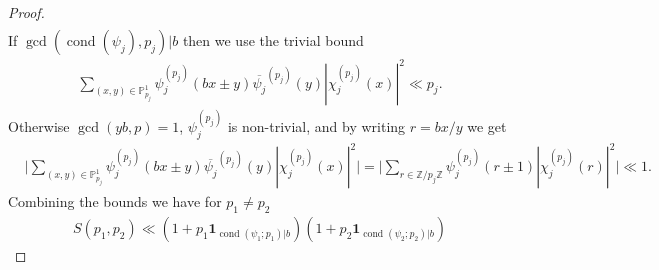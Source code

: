 \documentclass[12pt]{amsart}
\theoremstyle{definition}
\theoremstyle{remark}
\numberwithin{equation}{section}
\newcommand{\cond}{\operatorname{cond}}
\newcommand{\Z}{{\mathbb Z}}
\newcommand{\1}{{\mathbf 1}}
\renewcommand{\P}{\mathbb{P}}
\begin{document}
\begin{proof}
\begin{align*}
\end{align*}
If  $\gcd (\cond (\psi_j),p_j)|b$  then we use the trivial bound
\begin{align*}
   \sum_{(x,y) \in \P^1_{p_j}}  \psi_j^{(p_j)} (bx\pm y)  \overline{\psi_j}^{(p_j)}  (y) |\chi_j^{(p_j)}  (x )|^2   \ll p_j.
\end{align*}
Otherwise $\gcd(yb,p)=1$, $\psi_j^{(p_j)} $ is non-trivial,  and by writing $r = bx/y$ we get
\begin{align*}
    &\bigg|\sum_{(x,y) \in \P^1_{p_j}}  \psi_j^{(p_j)} (bx\pm y)  \overline{\psi_j}^{(p_j)}  (y) |\chi_j^{(p_j)}  (x )|^2\bigg|= \bigg|\sum_{r \in \Z/p_j \Z} \psi_j^{(p_j)} (r\pm 1)  |\chi_j^{(p_j)}  (r )|^2  \bigg|  \ll 1.
\end{align*}
 Combining the bounds we have for $p_1 \neq p_2$
\begin{align*}
    S(p_1,p_2) \ll  ( 1+ p_1  \mathbf{1}_{\cond(\psi_1;p_1) |b} )( 1+ p_2  \mathbf{1}_{\cond(\psi_2;p_2) |b} )
\end{align*} 




\end{proof}
\end{document}
